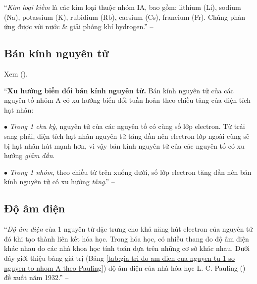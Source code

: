 \documentclass[oneside]{book}
\numberwithin{equation}{section}
\begin{document}
``\textit{Kim loại kiềm} là các kim loại thuộc nhóm IA, bao gồm: lithium (Li), sodium (Na), potassium (K), rubidium (Rb), caesium (Cs), francium (Fr). Chúng phản ứng được với nước \& giải phóng khí hydrogen.'' -- \cite[p. 43]{SGK_Hoa_Hoc_10_Chan_Troi_Sang_Tao}

\subsection{Bán kính nguyên tử}
Xem \cite[Hình 6.1: \textsf{Bán kính nguyên tử của 1 số nguyên tố được biểu diễn bằng pm ($\rm 1\ pm = 10^{-12}\ m$)}]{SGK_Hoa_Hoc_10_Chan_Troi_Sang_Tao} (\cite{Buthelezi_Dingrando_Hainen_Wistrom_Zike2013}).

``\textbf{Xu hướng biến đổi bán kính nguyên tử.} Bán kính nguyên tử của các nguyên tố nhóm A có xu hướng biến đổi tuần hoàn theo chiều tăng của điện tích hạt nhân:
\begin{enumerate*}
	\item[$\bullet$] \textit{Trong 1 chu kỳ}, nguyên tử của các nguyên tố có cùng số lớp electron. Từ trái sang phải, điện tích hạt nhân nguyên tử tăng dần nên electron lớp ngoài cùng sẽ bị hạt nhân hút mạnh hơn, vì vậy bán kính nguyên tử của các nguyên tố có xu hướng \textit{giảm dần}.
	\item[$\bullet$] \textit{Trong 1 nhóm}, theo chiều từ trên xuống dưới, số lớp electron tăng dần nên bán kính nguyên tử có xu hướng \textit{tăng}.'' -- \cite[p. 44]{SGK_Hoa_Hoc_10_Chan_Troi_Sang_Tao}
\end{enumerate*}

\subsection{Độ âm điện}
``\textit{Độ âm điện} của 1 nguyên tử đặc trưng cho khả năng hút electron của nguyên tử đó khi tạo thành liên kết hóa học. Trong hóa học, có nhiều thang đo độ âm điện khác nhau do các nhà khoa học tính toán dựa trên những cơ sở khác nhau. Dưới đây giới thiệu bảng giá trị (Bảng \ref{tab:gia tri do am dien cua nguyen tu 1 so nguyen to nhom A theo Pauling}) độ âm điện của nhà hóa học L. C. Pauling (\cite{Buthelezi_Dingrando_Hainen_Wistrom_Zike2013}) đề xuất năm 1932.'' -- \cite[p. 44]{SGK_Hoa_Hoc_10_Chan_Troi_Sang_Tao}
\end{document}
